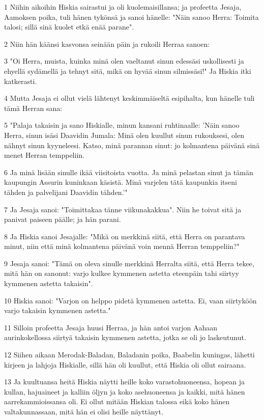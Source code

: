 \par 1 Niihin aikoihin Hiskia sairastui ja oli kuolemaisillansa; ja profeetta Jesaja, Aamoksen poika, tuli hänen tykönsä ja sanoi hänelle: "Näin sanoo Herra: Toimita talosi; sillä sinä kuolet etkä enää parane".
\par 2 Niin hän käänsi kasvonsa seinään päin ja rukoili Herraa sanoen:
\par 3 "Oi Herra, muista, kuinka minä olen vaeltanut sinun edessäsi uskollisesti ja ehyellä sydämellä ja tehnyt sitä, mikä on hyvää sinun silmissäsi!" Ja Hiskia itki katkerasti.
\par 4 Mutta Jesaja ei ollut vielä lähtenyt keskimmäiseltä esipihalta, kun hänelle tuli tämä Herran sana:
\par 5 "Palaja takaisin ja sano Hiskialle, minun kansani ruhtinaalle: 'Näin sanoo Herra, sinun isäsi Daavidin Jumala: Minä olen kuullut sinun rukouksesi, olen nähnyt sinun kyyneleesi. Katso, minä parannan sinut: jo kolmantena päivänä sinä menet Herran temppeliin.
\par 6 Ja minä lisään sinulle ikää viisitoista vuotta. Ja minä pelastan sinut ja tämän kaupungin Assurin kuninkaan käsistä. Minä varjelen tätä kaupunkia itseni tähden ja palvelijani Daavidin tähden.'"
\par 7 Ja Jesaja sanoi: "Toimittakaa tänne viikunakakkua". Niin he toivat sitä ja panivat paiseen päälle; ja hän parani.
\par 8 Ja Hiskia sanoi Jesajalle: "Mikä on merkkinä siitä, että Herra on parantava minut, niin että minä kolmantena päivänä voin mennä Herran temppeliin?"
\par 9 Jesaja sanoi: "Tämä on oleva sinulle merkkinä Herralta siitä, että Herra tekee, mitä hän on sanonut: varjo kulkee kymmenen astetta eteenpäin tahi siirtyy kymmenen astetta takaisin".
\par 10 Hiskia sanoi: "Varjon on helppo pidetä kymmenen astetta. Ei, vaan siirtyköön varjo takaisin kymmenen astetta."
\par 11 Silloin profeetta Jesaja huusi Herraa, ja hän antoi varjon Aahaan aurinkokellossa siirtyä takaisin kymmenen astetta, jotka se oli jo laskeutunut.
\par 12 Siihen aikaan Merodak-Baladan, Baladanin poika, Baabelin kuningas, lähetti kirjeen ja lahjoja Hiskialle, sillä hän oli kuullut, että Hiskia oli ollut sairaana.
\par 13 Ja kuultuansa heitä Hiskia näytti heille koko varastohuoneensa, hopean ja kullan, hajuaineet ja kalliin öljyn ja koko asehuoneensa ja kaikki, mitä hänen aarrekammioissansa oli. Ei ollut mitään Hiskian talossa eikä koko hänen valtakunnassaan, mitä hän ei olisi heille näyttänyt.
